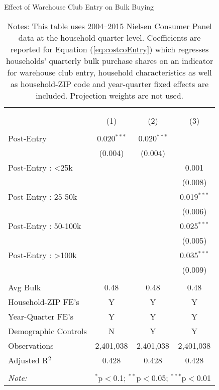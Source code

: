 \begin{table}[!htbp] \centering
  \caption{Effect of Warehouse Club Entry on Bulk Buying}
  \label{tab:costcoEntryDD}
\begin{tabular}{@{\extracolsep{5pt}}lccc}
\\[-1.8ex]\hline
\hline \\[-1.8ex]
\\[-1.8ex] & (1) & (2) & (3)\\
\hline \\[-1.8ex]
 Post-Entry & 0.020$^{***}$ & 0.020$^{***}$ &  \\
  & (0.004) & (0.004) &  \\
  Post-Entry : <25k &  &  & 0.001 \\
  &  &  & (0.008) \\
  Post-Entry : 25-50k &  &  & 0.019$^{***}$ \\
  &  &  & (0.006) \\
  Post-Entry : 50-100k &  &  & 0.025$^{***}$ \\
  &  &  & (0.005) \\
  Post-Entry : >100k &  &  & 0.035$^{***}$ \\
  &  &  & (0.009) \\
 \hline \\[-1.8ex]
 Avg Bulk & 0.48 & 0.48 & 0.48 \\
Household-ZIP FE's & Y & Y & Y \\
Year-Quarter FE's & Y & Y & Y \\
Demographic Controls & N & Y & Y \\
Observations & 2,401,038 & 2,401,038 & 2,401,038 \\
Adjusted R$^{2}$ & 0.428 & 0.428 & 0.428 \\
\hline
\hline \\[-1.8ex]
\textit{Note:}  & \multicolumn{3}{l}{$^{*}$p$<$0.1; $^{**}$p$<$0.05; $^{***}$p$<$0.01} \\
\end{tabular}
\caption*{Notes: This table uses 2004--2015 Nielsen Consumer Panel data at the household-quarter level. Coefficients are reported for Equation (\ref{eq:costcoEntry}) which regresses households' quarterly bulk purchase shares on an indicator for warehouse club entry, household characteristics as well as household-ZIP code and year-quarter fixed effects are included. Projection weights are not used.}
\end{table}
